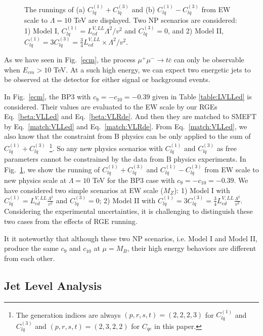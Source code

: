 \documentclass[a4paper,11pt]{article}
\begin{document}
\begin{figure}
\begin{subfigure}[t]{0.45\textwidth}
     \caption{}
  \end{subfigure}
  \caption{The runnings of (a) $C^{(1)}_{lq}+C^{(3)}_{lq}$ and (b) $C^{(1)}_{lq}-C^{(3)}_{lq}$ from EW scale to $\Lambda=10$ TeV are displayed.  Two NP scenarios are considered: 1) Model I, $C^{(1)}_{lq}=L^{V,LL}_{ed}\Lambda^2/v^2$ and $C^{(3)}_{lq}=0$, and 2) Model II, $C^{(1)}_{lq}=3C^{(3)}_{lq}=\frac{3}{4}L^{V,LL}_{ed}\times \Lambda^2/v^2$.\label{rge:EWtoUV}}
\end{figure}

As we have seen in Fig.~\ref{ecm}, the process $\mu^+\mu^-\to t\bar{c}$ can only be observable when $E_{cm}>10$ TeV.  At a such high energy, we can expect two energetic jets to be observed at the detector for either signal or background events. 

In Fig.~\ref{ecm}, the BP3 with $c_{9}=-c_{10}=-0.39$ given in Table \ref{table:LVLLed} is considered.
Their values are evaluated to the EW scale by our RGEs Eq.~\ref{beta:VLLed} and Eq.~\ref{beta:VLRde}. 
And then they are matched to SMEFT by Eq.~\ref{match:VLLed} and Eq.~\ref{match:VLRde}. 
From Eq.~\ref{match:VLLed}, we also know that the constraint from B physics can be only applied to the sum of $C^{(1)}_{lq}+C^{(3)}_{lq}$~\footnote{The generation indices are always $(p,r,s,t)=(2,2,2,3)$ for $C^{(1)}_{lq}$ and $C^{(3)}_{lq}$ and $(p,r,s,t)=(2,3,2,2)$ for $C_{qe}$ in this paper.}.  
So any new physics scenarios with $C^{(1)}_{lq}$ and $C^{(3)}_{lq}$ as free parameters cannot be constrained by the data from B physics experiments. 
In Fig.~\ref{rge:EWtoUV}, we show the running of $C^{(1)}_{lq}+C^{(3)}_{lq}$ and $C^{(1)}_{lq}-C^{(3)}_{lq}$ from EW scale to new physics scale at $\Lambda=10$ TeV for the BP3 case with $c_{9}=-c_{10}=-0.39$.
We have considered two simple scenarios at EW scale ($M_Z$): 1)  Model I with $C^{(1)}_{lq}=L^{V,LL}_{ed} \frac{\Lambda^2}{v^2}$ and $C^{(3)}_{lq} = 0$; 2) Model II with $C^{(1)}_{lq}=3 C^{(3)}_{lq}=\frac{3}{4} L^{V,LL}_{ed} \frac{\Lambda^2}{v^2}$.
Considering the experimental uncertainties, it is challenging to distinguish these two cases from the effects of RGE running. 

It it noteworthy that although these two NP scenarios, i.e. Model I and Model II, produce the same $c_9$ and $c_{10}$ at $\mu=M_B$, their high energy behaviors are different from each other. 

\subsection{Jet Level Analysis}
\end{document}
